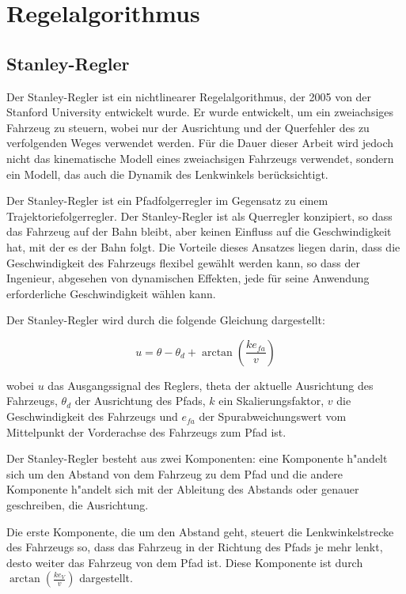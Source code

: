 \documentclass[arbeit=studie,oneside,BCOR=12mm]{ArbeitRST}
\begin{document}
\chapter{Regelalgorithmus}

\section{Stanley-Regler}

Der Stanley-Regler ist ein nichtlinearer Regelalgorithmus, der 2005 von der
Stanford University entwickelt wurde. Er wurde entwickelt, um ein zweiachsiges 
Fahrzeug zu steuern, wobei nur der Ausrichtung und der Querfehler des zu verfolgenden 
Weges verwendet werden. Für die Dauer dieser Arbeit wird jedoch nicht das 
kinematische Modell eines zweiachsigen Fahrzeugs verwendet, sondern ein Modell,
das auch die Dynamik des Lenkwinkels berücksichtigt.

Der Stanley-Regler ist ein Pfadfolgerregler im Gegensatz zu einem 
Trajektoriefolgerregler. Der Stanley-Regler ist als Querregler konzipiert, so 
dass das Fahrzeug auf der Bahn bleibt, aber keinen Einfluss auf die 
Geschwindigkeit hat, mit der es der Bahn folgt. Die Vorteile dieses Ansatzes 
liegen darin, dass die Geschwindigkeit des Fahrzeugs flexibel gewählt werden 
kann, so dass der Ingenieur, abgesehen von dynamischen Effekten, jede für 
seine Anwendung erforderliche Geschwindigkeit wählen kann.

Der Stanley-Regler wird durch die folgende Gleichung dargestellt:

\begin{equation}
    u = \theta - \theta_d + \arctan\left(\frac{ke_{fa}}{v}\right)
    \label{eq:Stanley-Regler}
\end{equation}

wobei $u$ das Ausgangssignal des Reglers, theta der aktuelle Ausrichtung des 
Fahrzeugs, $\theta_d$ der Ausrichtung des Pfads, $k$ ein Skalierungsfaktor, 
$v$ die Geschwindigkeit des 
Fahrzeugs und $e_{fa}$ der Spurabweichungswert vom Mittelpunkt der Vorderachse des 
Fahrzeugs zum Pfad ist.


Der Stanley-Regler besteht aus zwei Komponenten: eine Komponente h"andelt sich 
um den Abstand von dem Fahrzeug zu dem Pfad und die andere Komponente h"andelt
sich mit der Ableitung des Abstands oder genauer geschreiben, die Ausrichtung.

Die erste Komponente, die um den Abstand geht, steuert die Lenkwinkelstrecke des 
Fahrzeugs so, dass das Fahrzeug in der Richtung des Pfads je mehr lenkt, desto 
weiter 
das Fahrzeug von dem Pfad ist. Diese Komponente ist durch 
$\arctan\left(\frac{ke_V}{v}\right)$ dargestellt.
\end{document}

